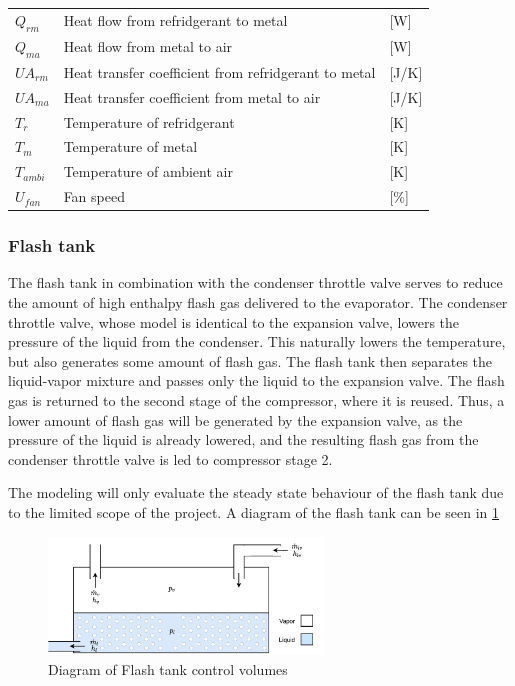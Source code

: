 \begin{center}
	\begin{tabular}{l p{8cm} l}
		$Q_{rm}$				&	Heat flow from refridgerant to metal					& [\si{W}] \\
		$Q_{ma}$				&	Heat flow from metal to air								& [\si{W}] \\
		$U A_{rm}$				& 	Heat transfer coefficient from refridgerant to metal 	& [\si{J}/\si{K}] \\
		$U A_{ma}$				& 	Heat transfer coefficient from metal to air				& [\si{J}/\si{K}] \\
		$T_r$					& 	Temperature of refridgerant 							& [\si{K}] \\
		$T_m$					&	Temperature of metal 									& [\si{K}] \\
		$T_{ambi}$				&	Temperature of ambient air 								& [\si{K}] \\
		$U_{fan}$				&	Fan speed												& [$\%$] \\
	\end{tabular}
\end{center}



\subsubsection{Flash tank}
The flash tank in combination with the condenser throttle valve serves to reduce the amount of high enthalpy flash gas delivered to the evaporator. The condenser throttle valve, whose model is identical to the expansion valve, lowers the pressure of the liquid from the condenser. This naturally lowers the temperature, but also generates some amount of flash gas. The flash tank then separates the liquid-vapor mixture and passes only the liquid to the expansion valve. The flash gas is returned to the second stage of the compressor, where it is reused. Thus, a lower amount of flash gas will be generated by the expansion valve, as the pressure of the liquid is already lowered, and the resulting flash gas from the condenser throttle valve is led to compressor stage 2.

The modeling will only evaluate the steady state behaviour of the flash tank due to the limited scope of the project. A diagram of the flash tank can be seen in \cref{fig:flash_tank_CV}

\begin{figure}[h!]
	\centering
	\includegraphics[width=0.65\textwidth]{Graphics/Flash_tank.pdf}
	\caption{Diagram of Flash tank control volumes}
	\label{fig:flash_tank_CV}
\end{figure}

